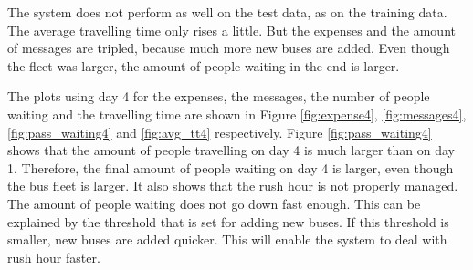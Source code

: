 \begin{table}[htbp]

The system does not perform as well on the test data, as on the training data. The average travelling time only rises a little. But the expenses and the amount of messages are tripled, because much more new buses are added. Even though the fleet was larger, the amount of people waiting in the end is larger. 

The plots using day 4 for the expenses, the messages, the number of people waiting and the travelling time are shown in Figure \ref{fig:expense4}, \ref{fig:messages4}, \ref{fig:pass_waiting4} and \ref{fig:avg_tt4} respectively. Figure \ref{fig:pass_waiting4} shows that the amount of people travelling on day 4 is much larger than on day 1. Therefore, the final amount of people waiting on day 4 is larger, even though the bus fleet is larger. It also shows that the rush hour is not properly managed. The amount of people waiting does not go down fast enough. This can be explained by the threshold that is set for adding new buses. If this threshold is smaller, new buses are added quicker. This will enable the system to deal with rush hour faster. 


\end{table}
